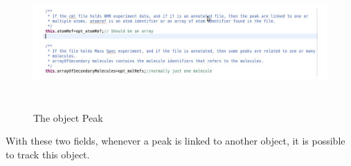     \begin{figure}[h]
    \begin{centering}
    \caption{The object Peak}
\includegraphics[width=195mm,height=50mm]{./images/peakAnnotation}
    \end{centering}
    \end{figure}
With these two fields, whenever a peak is linked to another object,  it is possible to track this object.




\clearpage
